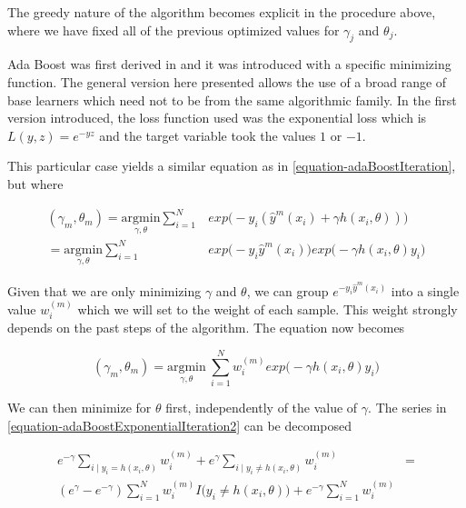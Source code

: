 The greedy nature of the algorithm becomes explicit in the procedure above, where we have fixed all of the previous optimized values for $\gamma_j$ and $\theta_j$.

Ada Boost was first derived in \textcite{schapire-adaBoost} and it was introduced with a specific  minimizing function. The general version here presented allows the use of a broad range of base learners which need not to be from the same algorithmic family. In the first version introduced, the loss function used was the exponential loss which is $L(y,z) = e^{-yz}$ and the target variable took the values $1$ or $-1$.

This particular case yields a similar equation as in \ref{equation-adaBoostIteration}, but where

\begin{equation} \label{equation-adaBoostExponentialIteration}
\begin{split}
(\gamma_{m}, \theta_{m}) = \underset{\gamma, \theta}{\mathrm{argmin}}  \sum_{i=1}^{N} & exp\big( -y_i  (\hat{y}^{m}(x_i) + \gamma h(x_i,\theta) )\big) \\
= \underset{\gamma, \theta}{\mathrm{argmin}}  \sum_{i=1}^{N} & exp\big( -y_i  \hat{y}^{m}(x_i)\big) exp\big(- \gamma h(x_i,\theta)y_i \big)
\end{split}
\end{equation}


Given that we are only minimizing $\gamma$ and $\theta$, we can group $e^{-y_i  \hat{y}^{m}(x_i)}$ into a single value $w_i^{(m)}$ which we will set to the weight of each sample. This weight strongly depends on the past steps of the algorithm.  The equation now becomes


\begin{equation} \label{equation-adaBoostExponentialIteration2}
(\gamma_{m}, \theta_{m}) = \underset{\gamma, \theta}{\mathrm{argmin}} \    \sum_{i=1}^{N}  w_i^{(m)} exp \big(-\gamma h(x_i,\theta)y_i \big)
\end{equation}

We can then minimize for $\theta$ first, independently of the value of $\gamma$. The series in \ref{equation-adaBoostExponentialIteration2} can be decomposed

\begin{equation} \label{equation-adaBoostThetaDecomposition}
\begin{split}
e^{-\gamma} \sum_{i \mid y_i = h(x_i,\theta)} w_i^{(m)}  + e^{\gamma} \sum_{i \mid y_i \neq h(x_i,\theta)} w_i^{(m)} & = \\
( e^{\gamma} - e^{-\gamma}) \sum_{i = 1}^{N} w_i^{(m)} I \big( y_i \neq h(x_i,\theta)   \big)  + e^{-\gamma} \sum_{i = 1}^{N}   w_i^{(m)} &
\end{split}
\end{equation}


